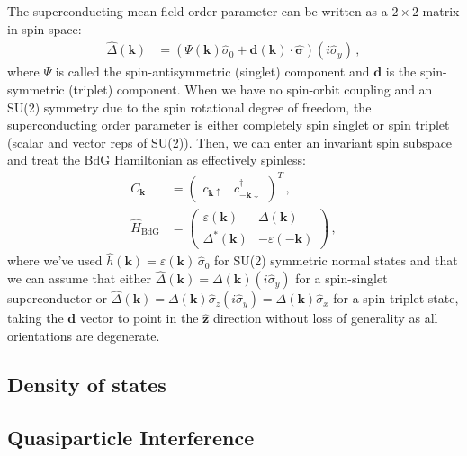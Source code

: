 \documentclass[aps,prb,twocolumn,superscriptaddress,nofootinbib]{revtex4-2}
\newcommand{\bk}{\bm{k}}
\begin{document}
The superconducting mean-field order parameter can be written as a $2 \times 2$ matrix in spin-space:
\begin{align} \label{eqn:order_param_breakdown}
    \hat{\Delta} (\bk)
    &= ( \Psi (\bk) \hat{\sigma}_0 + \bm{d} (\bk) \cdot \hat{\bm{\sigma}} ) (i \hat{\sigma}_y) \, ,
\end{align}
where $\Psi$ is called the spin-antisymmetric (singlet) component and $\bm{d}$ is the spin-symmetric (triplet) component.
When we have no spin-orbit coupling and an SU(2) symmetry due to the spin rotational degree of freedom, the superconducting order parameter is either completely spin singlet or spin triplet (scalar and vector reps of SU(2)). Then, we can enter an invariant spin subspace and treat the BdG Hamiltonian as effectively spinless:
\begin{align}
    C_{\bk} &= \begin{pmatrix} c_{\bk \uparrow} &
        c^{\dagger}_{-\bk \downarrow} \end{pmatrix}^T  \, , \\
    \hat{H}_{\text{BdG}} &= \begin{pmatrix} \varepsilon (\bk) & \Delta (\bk) \\
        \Delta^{*} (\bk) & - \varepsilon (-\bk) \end{pmatrix} \, ,
\end{align}
where we've used $\hat{h}(\bk) = \varepsilon (\bk) \, \hat{{\sigma}}_0$ for SU(2) symmetric normal states and that we can assume that either $ \hat{\Delta} (\bk) = \Delta (\bk) (i \hat{\sigma}_y)$ for a spin-singlet superconductor or $ \hat{\Delta} (\bk) = \Delta (\bk) \hat{\sigma}_z (i \hat{\sigma}_y) = \Delta (\bk) \hat{\sigma}_x $ for a spin-triplet state, taking the $\bm{d}$ vector to point in the $\hat{\bm{z}}$ direction without loss of generality as all orientations are degenerate.

\subsection{Density of states}



\subsection{Quasiparticle Interference}
\end{document}
